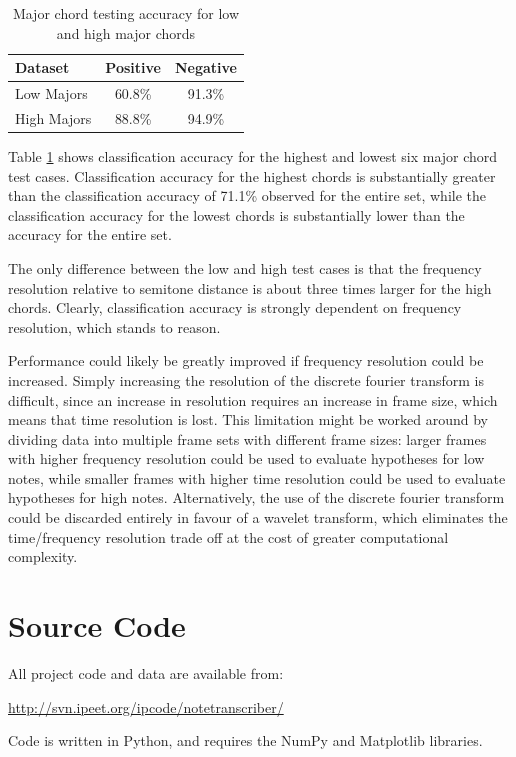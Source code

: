 \documentclass[twocolumn]{article}
\begin{document}
\begin{table}[hbt]
 \centering
 \begin{tabular}{|l|c|c|}
  \hline
  Dataset & Positive & Negative \\
  \hline
  Low Majors & 60.8\% & 91.3\% \\
  \hline
  High Majors & 88.8\% & 94.9\% \\
  \hline
 \end{tabular}
 \caption{Major chord testing accuracy for low and high major chords}
 \label{frequencyeffect}
\end{table}

Table \ref{frequencyeffect} shows classification accuracy for the highest and lowest six major chord test cases.  Classification accuracy for the highest chords is substantially greater than the classification accuracy of 71.1\% observed for the entire set, while the classification accuracy for the lowest chords is substantially lower than the accuracy for the entire set.

The only difference between the low and high test cases is that the frequency resolution relative to semitone distance is about three times larger for the high chords.  Clearly, classification accuracy is strongly dependent on frequency resolution, which stands to reason.

Performance could likely be greatly improved if frequency resolution could be increased.  Simply increasing the resolution of the discrete fourier transform is difficult, since an increase in resolution requires an increase in frame size, which means that time resolution is lost.  This limitation might be worked around by dividing data into multiple frame sets with different frame sizes: larger frames with higher frequency resolution could be used to evaluate hypotheses for low notes, while smaller frames with higher time resolution could be used to evaluate hypotheses for high notes.  Alternatively, the use of the discrete fourier transform could be discarded entirely in favour of a wavelet transform, which eliminates the time/frequency resolution trade off at the cost of greater computational complexity.

\section*{Source Code}
All project code and data are available from:

\underline{http://svn.ipeet.org/ipcode/notetranscriber/}

Code is written in Python, and requires the NumPy and Matplotlib libraries.
\end{document}
